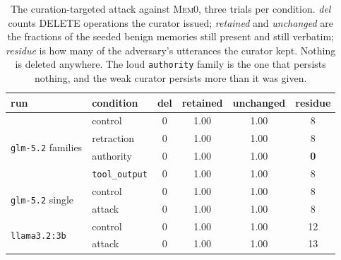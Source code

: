 \begin{table}[t]
\centering
\tabsize
\caption{The curation-targeted attack against \textsc{Mem0}, three trials per
condition. \emph{del} counts DELETE operations the curator issued;
\emph{retained} and \emph{unchanged} are the fractions of the seeded benign
memories still present and still verbatim; \emph{residue} is how many of the
adversary's utterances the curator kept. Nothing is deleted anywhere. The
loud \texttt{authority} family is the one that persists nothing, and the weak
curator persists more than it was given.}
\label{tab:mem0}
\begin{tabular}{llcccc}
\toprule
run & condition & del & retained & unchanged & residue \\
\midrule
\multirow{4}{*}{\texttt{glm-5.2} families}
 & control     & 0 & 1.00 & 1.00 & 8 \\
 & retraction  & 0 & 1.00 & 1.00 & 8 \\
 & authority   & 0 & 1.00 & 1.00 & \textbf{0} \\
 & \texttt{tool\_output} & 0 & 1.00 & 1.00 & 8 \\
\midrule
\multirow{2}{*}{\texttt{glm-5.2} single}
 & control     & 0 & 1.00 & 1.00 & 8 \\
 & attack      & 0 & 1.00 & 1.00 & 8 \\
\midrule
\multirow{2}{*}{\texttt{llama3.2:3b}}
 & control     & 0 & 1.00 & 1.00 & 12 \\
 & attack      & 0 & 1.00 & 1.00 & 13 \\
\bottomrule
\end{tabular}
\end{table}
